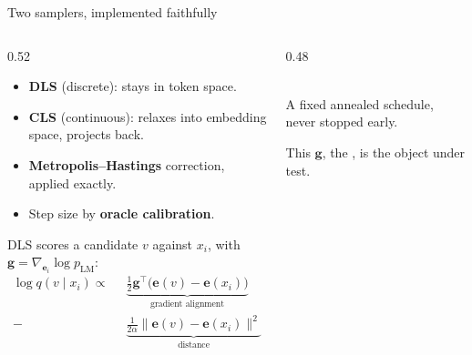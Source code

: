 \documentclass{beamer}
\begin{document}
\begin{frame}{Two samplers, implemented faithfully}
  \begin{columns}[T]
    \begin{column}{0.52\textwidth}
      \begin{itemize}\small
        \item \textbf{DLS} (discrete): stays in token space.
        \item \textbf{CLS} (continuous): relaxes into embedding space, projects back.
        \item \textbf{Metropolis--Hastings} correction, applied exactly.
        \item Step size by \textbf{oracle calibration}.
      \end{itemize}
      \vspace{0.3em}
      {\scriptsize DLS scores a candidate $v$ against $x_i$, with $\bm{g} = \nabla_{\bm{e}_i}\log p_{\text{LM}}$:}
      {\footnotesize
      \begin{align*}
        \log q(v \mid x_i) \propto\;\; & \underbrace{\tfrac{1}{2}\bm{g}^\top\!\big(\bm{e}(v)-\bm{e}(x_i)\big)}_{\text{gradient alignment}} \\[0.2em]
        -\;\; & \underbrace{\tfrac{1}{2\alpha}\big\lVert \bm{e}(v)-\bm{e}(x_i)\big\rVert^2}_{\text{distance}}
      \end{align*}}
    \end{column}
    \begin{column}{0.48\textwidth}
      \begin{center}
      \\[0.4em]{\scriptsize A fixed annealed schedule, never stopped early.}
      \end{center}
      \vspace{0.8em}
      {\small This $\bm{g}$, the , is the object under test.}
    \end{column}
  \end{columns}
\end{frame}
\end{document}
